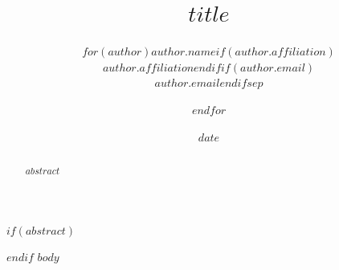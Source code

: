\documentclass[11pt]{article}
\title{$title$}
\author{$for(author)$$author.name$$if(author.affiliation)$\\ \small $author.affiliation$$endif$$if(author.email)$\\ \small \texttt{$author.email$}$endif$$sep$ \and $endfor$}
\date{$date$}
\begin{document}
\maketitle
$if(abstract)$
\begin{abstract}
$abstract$
\end{abstract}
$endif$
$body$


\end{document}
